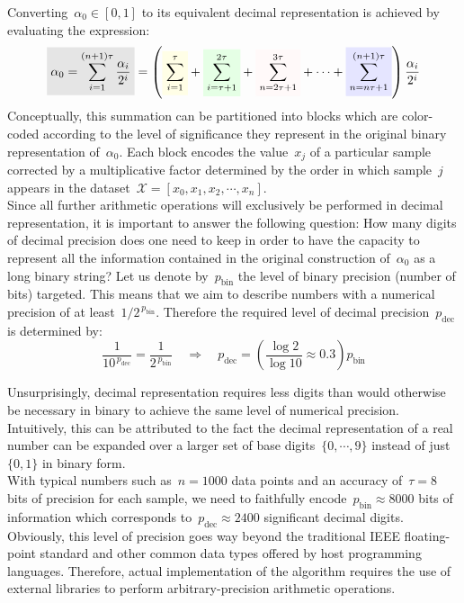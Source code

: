 \documentclass{article}
\newcommand{\highlight}[2][yellow]{\mathchoice%
  {\colorbox{#1}{$\displaystyle#2$}}%
  {\colorbox{#1}{$\textstyle#2$}}%
  {\colorbox{#1}{$\scriptstyle#2$}}%
  {\colorbox{#1}{$\scriptscriptstyle#2$}}}%
\begin{document}
Converting~$\alpha_0 \in [0,1]$ to its equivalent decimal representation is achieved by evaluating the expression:
\begin{equation*}
\highlight[black!10]{\alpha_0 = \sum_{i=1}^{(n+1)\tau} \dfrac{\alpha_i}{2^i} } = \left(  \highlight[yellow!10]{\sum_{i=1}^\tau}  + \highlight[green!10]{\sum_{i=\tau+1}^{2 \tau}}  + \highlight[pink!10]{\sum_{n=2\tau+1}^{3 \tau}}  + \cdots + \highlight[blue!10]{\sum_{n=n\tau + 1}^{(n+1)\tau}} \right) \dfrac{\alpha_i}{2^i} 
\end{equation*}
Conceptually, this summation can be partitioned into blocks which are color-coded according to the level of significance they represent in the original binary representation of~$\alpha_0$. Each block encodes the value~$x_j$ of a particular sample corrected by a multiplicative factor determined by the order in which sample~$j$ appears in the dataset~$\mathcal{X} = [x_0, x_1, x_2, \cdots , x_n]$. \\

\noindent Since all further arithmetic operations will exclusively be performed in decimal representation, it is important to answer the following question: How many digits of decimal precision does one need to keep in order to have the capacity to represent all the information contained in the original construction of~$\alpha_0$ as a long binary string?  Let us denote by~$p_\text{bin}$ the level of binary precision (number of bits) targeted.  This means that we aim to describe numbers with a numerical precision of at least~$1 / 2^{\,p_\text{bin}}$.  Therefore the required level of decimal precision~$p_\text{dec}$ is determined by:
\begin{equation*}
\dfrac{1}{{10}^{\,p_\text{dec}}}  = \dfrac{1}{2^{\,p_\text{bin}}} \quad 
\Longrightarrow \quad p_\text{dec} = \left( \dfrac{\log 2}{\log 10} \approx 0.3 \right) p_\text{bin}
\end{equation*}

\noindent Unsurprisingly, decimal representation requires less digits than would otherwise be necessary in binary to achieve the same level of numerical precision.  Intuitively, this can be attributed to the fact the decimal representation of a real number can be expanded over a larger set of base digits~$\{ 0, \cdots , 9 \}$ instead of just~$\{ 0,1 \}$ in binary form. \\

\noindent With typical numbers such as~$n=1000$ data points and an accuracy of~$\tau=8$ bits of precision for each sample, we need to faithfully encode~$p_\text{bin} \approx 8000$ bits of information which corresponds to~$p_\text{dec} \approx 2400$ significant decimal digits.  Obviously, this level of precision goes way beyond the traditional IEEE floating-point standard and other common data types offered by host programming languages.  Therefore, actual implementation of the algorithm requires the use of external libraries to perform arbitrary-precision arithmetic operations. 
\end{document}
